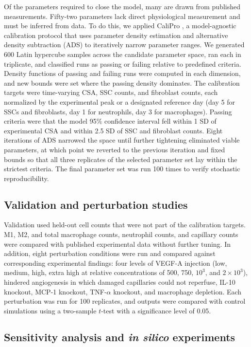 \documentclass[10pt,letterpaper]{article}
\begin{document}
Of the parameters required to close the model, many are drawn from published measurements. Fifty-two parameters lack direct physiological measurement and must be inferred from data. To do this, we applied CaliPro \cite{joslyn2021calipro}, a model-agnostic calibration protocol that uses parameter density estimation and alternative density subtraction (ADS) to iteratively narrow parameter ranges. We generated 600 Latin hypercube samples across the candidate parameter space, ran each in triplicate, and classified runs as passing or failing relative to predefined criteria. Density functions of passing and failing runs were computed in each dimension, and new bounds were set where the passing density dominates. The calibration targets were time-varying CSA, SSC counts, and fibroblast counts, each normalized by the experimental peak or a designated reference day (day 5 for SSCs and fibroblasts, day 1 for neutrophils, day 3 for macrophages). Passing criteria were that the model 95\% confidence interval fell within 1 SD of experimental CSA and within 2.5 SD of SSC and fibroblast counts. Eight iterations of ADS narrowed the space until further tightening eliminated viable parameters, at which point we reverted to the previous iteration and fixed bounds so that all three replicates of the selected parameter set lay within the strictest criteria. The final parameter set was run 100 times to verify stochastic reproducibility.

\subsection{Validation and perturbation studies}

Validation used held-out cell counts that were not part of the calibration targets. M1, M2, and total macrophage counts, neutrophil counts, and capillary counts were compared with published experimental data without further tuning. In addition, eight perturbation conditions were run and compared against corresponding experimental findings: four levels of VEGF-A injection (low, medium, high, extra high at relative concentrations of 500, 750, $10^3$, and $2 \times 10^3$), hindered angiogenesis in which damaged capillaries could not reperfuse, IL-10 knockout, MCP-1 knockout, TNF-$\alpha$ knockout, and macrophage depletion. Each perturbation was run for 100 replicates, and outputs were compared with control simulations using a two-sample $t$-test with a significance level of 0.05.

\subsection{Sensitivity analysis and \emph{in silico} experiments}
\end{document}
